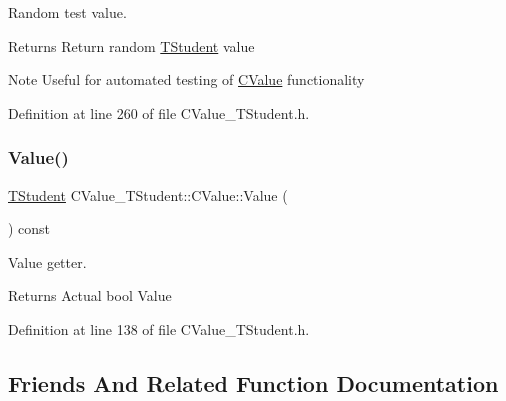 Random test value. 

\begin{DoxyReturn}{Returns}
Return random \hyperlink{struct_c_value___t_student_1_1_t_student}{T\+Student} value 
\end{DoxyReturn}
\begin{DoxyNote}{Note}
Useful for automated testing of \hyperlink{class_c_value___t_student_1_1_c_value}{C\+Value} functionality 
\end{DoxyNote}


Definition at line 260 of file C\+Value\+\_\+\+T\+Student.\+h.

\mbox{\label{class_c_value___t_student_1_1_c_value_a8b3771c6800a24fd9933dd1aaf30261a}} 
\subsubsection{\texorpdfstring{Value()}{Value()}}
{\footnotesize\ttfamily \hyperlink{struct_c_value___t_student_1_1_t_student}{T\+Student} C\+Value\+\_\+\+T\+Student\+::\+C\+Value\+::\+Value (\begin{DoxyParamCaption}{ }\end{DoxyParamCaption}) const\hspace{0.3cm}{\ttfamily [inline]}}



Value getter. 

\begin{DoxyReturn}{Returns}
Actual {\ttfamily bool} {\ttfamily Value} 
\end{DoxyReturn}


Definition at line 138 of file C\+Value\+\_\+\+T\+Student.\+h.



\subsection{Friends And Related Function Documentation}
\mbox{\label{class_c_value___t_student_1_1_c_value_a3d28097fae6bdd5a8146d9ab90f8b62f}} 
